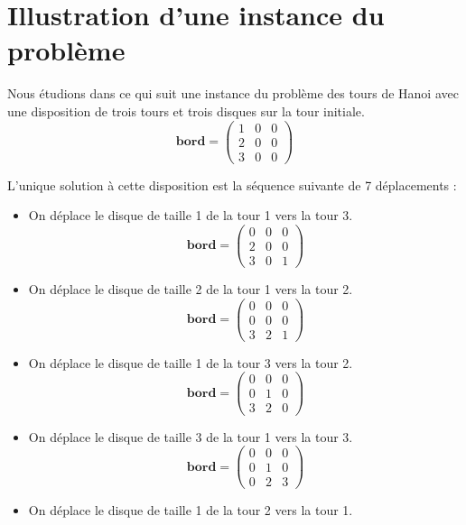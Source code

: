 \section{Illustration d'une instance du problème}
Nous étudions dans ce qui suit une instance du problème des tours de Hanoi avec une disposition de trois tours et trois disques sur la tour initiale.
$$
\mathbf{bord} = 
\begin{pmatrix}
    1 & 0 & 0 \\
    2 & 0 & 0 \\
    3 & 0 & 0 
\end{pmatrix}
$$
\par
L'unique solution à cette disposition est la séquence suivante de 7 déplacements :
\begin{itemize}
    \item On déplace le disque de taille 1 de la tour 1 vers la tour 3.
        $$
        \mathbf{bord} = 
        \begin{pmatrix}
            0 & 0 & 0 \\
            2 & 0 & 0 \\
            3 & 0 & 1 
        \end{pmatrix}
        $$
    \item On déplace le disque de taille 2 de la tour 1 vers la tour 2.
        $$
        \mathbf{bord} = 
        \begin{pmatrix}
            0 & 0 & 0 \\
            0 & 0 & 0 \\
            3 & 2 & 1 
        \end{pmatrix}
        $$
    \item On déplace le disque de taille 1 de la tour 3 vers la tour 2.
        $$
        \mathbf{bord} = 
        \begin{pmatrix}
            0 & 0 & 0 \\
            0 & 1 & 0 \\
            3 & 2 & 0 
        \end{pmatrix}
        $$
    \item On déplace le disque de taille 3 de la tour 1 vers la tour 3.
        $$
        \mathbf{bord} = 
        \begin{pmatrix}
            0 & 0 & 0 \\
            0 & 1 & 0 \\
            0 & 2 & 3 
        \end{pmatrix}
        $$
    \item On déplace le disque de taille 1 de la tour 2 vers la tour 1.

\end{itemize}
